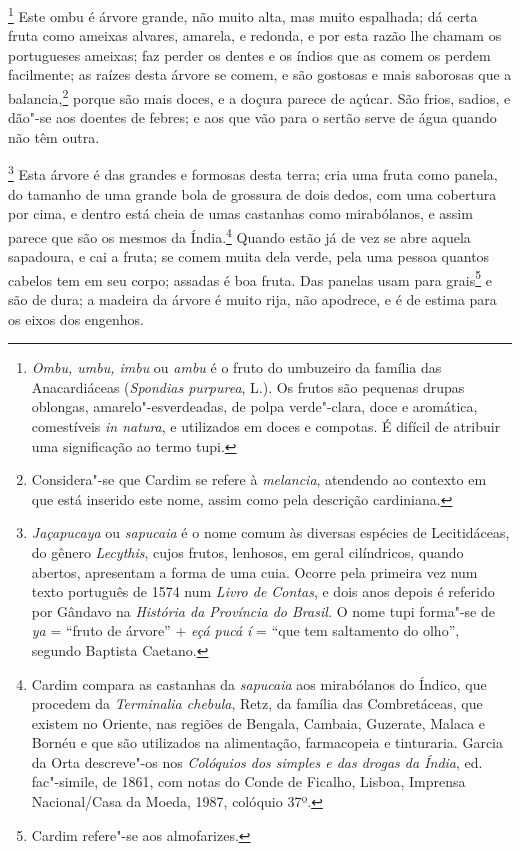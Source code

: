 \footnote{ \textit{Ombu, umbu, imbu} ou \textit{ambu} é
o fruto do umbuzeiro da família das Anacardiáceas (\textit{Spondias
purpurea}, L.). Os frutos são pequenas drupas oblongas,
amarelo"-esverdeadas, de polpa verde"-clara, doce e aromática,
comestíveis \textit{in natura}, e utilizados em doces e compotas. É
difícil de atribuir uma significação ao termo tupi.} Este
ombu é árvore grande, não muito alta, mas muito espalhada; dá certa
fruta como ameixas alvares, amarela, e redonda, e por esta razão lhe
chamam os portugueses ameixas; faz perder os dentes e os índios que as
comem os perdem facilmente; as raízes desta árvore se comem, e são
gostosas e mais saborosas que a balancia,\footnote{ Considera"-se que
Cardim se refere à \textit{melancia}, atendendo ao contexto em que está
inserido este nome, assim como pela descrição cardiniana.} porque
são mais doces, e a doçura parece de açúcar. São frios, sadios, e
dão"-se aos doentes de febres; e aos que vão para o sertão serve de água
quando não têm outra. 

\footnote{ \textit{Jaçapucaya} ou \textit{sapucaia} 
é o nome comum às diversas espécies de Lecitidáceas, do gênero
\textit{Lecythis}, cujos frutos, lenhosos, em geral cilíndricos, quando
abertos, apresentam a forma de uma cuia. Ocorre pela primeira vez num
texto português de 1574 num \textit{Livro de Contas}, e dois anos
depois é referido por Gândavo na \textit{História da Província do
Brasil.} O nome tupi forma"-se de \textit{ya} = ``fruto de árvore'' +
\textit{eçá pucá í} = ``que tem saltamento do olho'', segundo Baptista
Caetano.} Esta árvore é das grandes e formosas desta terra;
cria uma fruta como panela, do tamanho de uma grande bola de grossura
de dois dedos, com uma cobertura por cima, e dentro está cheia de umas
castanhas como mirabólanos, e assim parece que são os mesmos da
Índia.\footnote{ Cardim compara as castanhas da \textit{sapucaia} aos
mirabólanos do Índico, que procedem da \textit{Terminalia chebula}, 
Retz, da família das Combretáceas, que existem no Oriente, nas regiões
de Bengala, Cambaia, Guzerate, Malaca e Bornéu e que são utilizados na
alimentação, farmacopeia e tinturaria. Garcia da Orta descreve"-os nos
\textit{Colóquios dos simples e das drogas da Índia}, ed. fac"-simile,
de 1861, com notas do Conde de Ficalho, Lisboa, Imprensa Nacional/Casa da Moeda, 1987, colóquio 37º.} Quando estão já de vez se abre
aquela sapadoura, e cai a fruta; se comem muita dela verde, pela uma
pessoa quantos cabelos tem em seu corpo; assadas é boa fruta. Das
panelas usam para grais\footnote{ Cardim refere"-se aos almofarizes.} e
são de dura; a madeira da árvore é muito rija, não apodrece, e é de
estima para os eixos dos engenhos.

